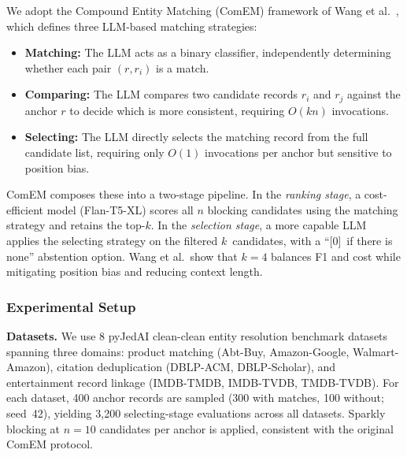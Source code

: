 We adopt the Compound Entity Matching (ComEM) framework of Wang et al.~\cite{wang2025match}, which defines three LLM-based matching strategies:

\begin{itemize}[leftmargin=*]
    \item \textbf{Matching:} The LLM acts as a binary classifier, independently determining whether each pair $(r, r_i)$ is a match.
    \item \textbf{Comparing:} The LLM compares two candidate records $r_i$ and $r_j$ against the anchor $r$ to decide which is more consistent, requiring $O(kn)$ invocations.
    \item \textbf{Selecting:} The LLM directly selects the matching record from the full candidate list, requiring only $O(1)$ invocations per anchor but sensitive to position bias.
\end{itemize}

ComEM composes these into a two-stage pipeline.  In the \emph{ranking stage}, a cost-efficient model (Flan-T5-XL) scores all $n$ blocking candidates using the matching strategy and retains the top-$k$.  In the \emph{selection stage}, a more capable LLM applies the selecting strategy on the filtered $k$~candidates, with a ``[0]~if there is none'' abstention option.  Wang et al.\ show that $k=4$ balances F1 and cost while mitigating position bias and reducing context length.

\subsubsection{Experimental Setup}

\textbf{Datasets.}  We use 8 pyJedAI clean-clean entity resolution benchmark datasets spanning three domains: product matching (Abt-Buy, Amazon-Google, Walmart-Amazon), citation deduplication (DBLP-ACM, DBLP-Scholar), and entertainment record linkage (IMDB-TMDB, IMDB-TVDB, TMDB-TVDB).  For each dataset, 400 anchor records are sampled (300 with matches, 100 without; seed~42), yielding 3{,}200 selecting-stage evaluations across all datasets.  Sparkly blocking at $n=10$ candidates per anchor is applied, consistent with the original ComEM protocol.

